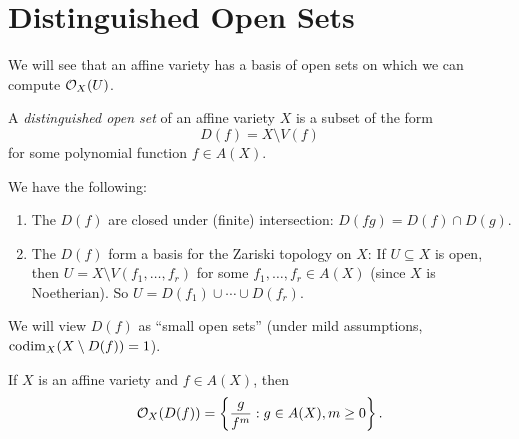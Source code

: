 \section{Distinguished Open Sets}
\begin{remark}
  We will see that an affine variety
  has a basis of open sets on which
  we can compute $\mathcal{O}_X(U)$.
\end{remark}

\begin{definition}
  A \emph{distinguished open set} of
  an affine variety $X$ is a subset of
  the form
  \[
    D(f) = X \setminus V(f)
  \]
  for some polynomial function $f \in A(X)$.
\end{definition}

\begin{remark}
  We have the following:
  \begin{enumerate}
    \item The $D(f)$ are closed under
      (finite) intersection: $D(fg) = D(f) \cap D(g)$.
    \item The $D(f)$ form a basis for the
      Zariski topology on $X$: If $U \subseteq X$ is
      open, then $U = X \setminus V(f_1, \dots, f_r)$
      for some $f_1, \dots, f_r \in A(X)$
      (since $X$ is Noetherian). So
      $U = D(f_1) \cup \cdots \cup D(f_r)$.
  \end{enumerate}
\end{remark}

\begin{remark}
  We will view $D(f)$ as
  ``small open sets'' (under mild
  assumptions, $\operatorname{codim}_X (X \setminus D(f)) = 1$).
\end{remark}

\begin{theorem}\label{thm:regular-functions-on-distinguished-open-sets}
  If $X$ is an affine variety and
  $f \in A(X)$, then
  \[
    \mathcal{O}_X(D(f))
    = \left\{
      \frac{g}{f^m} : g \in A(X), m \ge 0
    \right\}.
  \]
\end{theorem}

